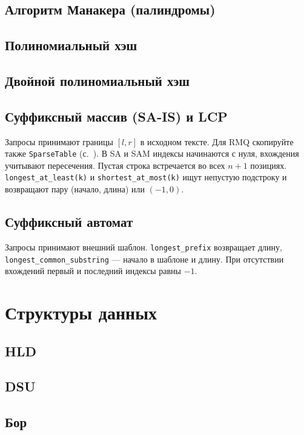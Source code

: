 \documentclass[a4paper,10pt,twocolumn,oneside]{article}
\begin{document}
\subsection{Алгоритм Манакера (палиндромы)}
\subsection{Полиномиальный хэш}
\subsection{Двойной полиномиальный хэш}
\subsection{Суффиксный массив (SA-IS) и LCP}
Запросы принимают границы $[l,r]$ в исходном тексте. Для RMQ скопируйте
также \texttt{SparseTable} (с.~\pageref{ds:sparse-table}).
В SA и SAM индексы начинаются с нуля, вхождения учитывают пересечения.
Пустая строка встречается во всех $n+1$ позициях.
\texttt{longest\_at\_least(k)} и \texttt{shortest\_at\_most(k)} ищут
непустую подстроку и возвращают пару (начало, длина) или $(-1,0)$.
\subsection{Суффиксный автомат}
Запросы принимают внешний шаблон. \texttt{longest\_prefix} возвращает
длину, \texttt{longest\_common\_substring} --- начало в шаблоне и длину.
При отсутствии вхождений первый и последний индексы равны $-1$.

\section{Структуры данных}
\subsection{HLD}
\subsection{DSU}
\subsection{Бор}
\end{document}
